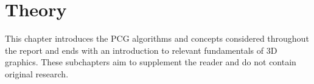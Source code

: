 \chapter{Theory}

This chapter introduces the PCG algorithms and concepts considered throughout the report and ends with an introduction to relevant fundamentals of 3D graphics.
These subchapters aim to supplement the reader and do not contain original research.








